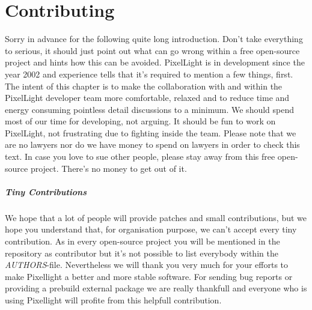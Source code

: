 \chapter{Contributing}
Sorry in advance for the following quite long introduction. Don't take everything to serious, it should just point out what can go wrong within a free open-source project and hints how this can be avoided. PixelLight is in development since the year 2002 and experience tells that it's required to mention a few things, first. The intent of this chapter is to make the collaboration with and within the PixelLight developer team more comfortable, relaxed and to reduce time and energy consuming pointless detail discussions to a minimum. We should spend most of our time for developing, not arguing. It should be fun to work on PixelLight, not frustrating due to fighting inside the team. Please note that we are no lawyers nor do we have money to spend on lawyers in order to check this text. In case you love to sue other people, please stay away from this free open-source project. There's no money to get out of it.


\paragraph{Tiny Contributions}
We hope that a lot of people will provide patches and small contributions, but we hope you understand that, for organisation purpose, we can't accept every tiny contribution. As in every open-source project you will be mentioned in the repository as contributor but it's not possible to list everybody within the \emph{AUTHORS}-file. Nevertheless we will thank you very much for your efforts to make Pixellight a better and more stable software. For sending bug reports or providing a prebuild external package we are really thankfull and everyone who is using Pixellight will profite from this helpfull contribution.


